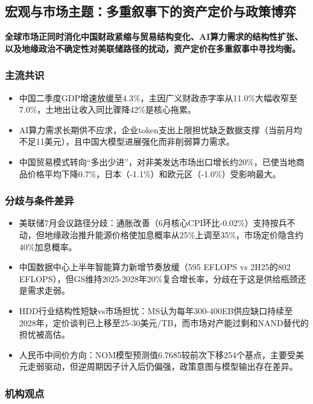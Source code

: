 \documentclass[11pt]{ctexart}
\begin{document}
\subsection{宏观与市场主题：多重叙事下的资产定价与政策博弈}
\textbf{全球市场正同时消化中国财政紧缩与贸易结构变化、AI算力需求的结构性扩张、以及地缘政治不确定性对美联储路径的扰动，资产定价在多重叙事中寻找均衡。}
\subsubsection*{主流共识}
\begin{itemize}
  \item 中国二季度GDP增速放缓至4.3\%，主因广义财政赤字率从11.0\%大幅收窄至7.0\%，土地出让收入同比骤降42\%是核心拖累。
  \item AI算力需求长期供不应求，企业token支出上限担忧缺乏数据支撑（当前月均不足11美元），且中国大模型进展强化而非削弱算力需求。
  \item 中国贸易模式转向“多出少进”，对非美发达市场出口增长约20\%，已使当地商品价格平均下降0.7\%，日本（-1.1\%）和欧元区（-1.0\%）受影响最大。
\end{itemize}
\subsubsection*{分歧与条件差异}
\begin{itemize}
  \item 美联储7月会议路径分歧：通胀改善（6月核心CPI环比-0.02\%）支持按兵不动，但地缘政治推升能源价格使加息概率从25\%上调至35\%，市场定价隐含约40\%加息概率。
  \item 中国数据中心上半年智能算力新增节奏放缓（595 EFLOPS vs 2H25的802 EFLOPS），但GS维持2025-2028年20\%复合增长率，分歧在于这是供给瓶颈还是需求走弱。
  \item HDD行业结构性短缺vs市场担忧：MS认为每年300-400EB供应缺口持续至2028年，定价谈判已上移至25-30美元/TB，而市场对产能过剩和NAND替代的担忧被高估。
  \item 人民币中间价方向：NOM模型预测值6.7685较前次下移254个基点，主要受美元走弱驱动，但逆周期因子计入后仍偏强，政策意图与模型输出存在差异。
\end{itemize}
\subsubsection*{机构观点}
\end{document}
